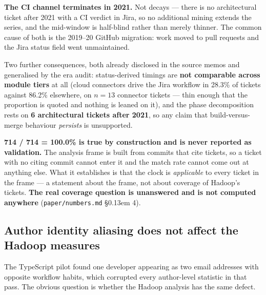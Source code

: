 \documentclass[conference]{IEEEtran}
\begin{document}
\textbf{The CI channel terminates in 2021.} Not decays --- there is no architectural ticket after 2021 with a CI verdict in Jira, so no additional mining extends the series, and the mid-window is half-blind rather than merely thinner. The common cause of both is the 2019--20 GitHub migration: work moved to pull requests and the Jira status field went unmaintained.

Two further consequences, both already disclosed in the source memos and generalised by the era audit: status-derived timings are \textbf{not comparable across module tiers} at all (cloud connectors drive the Jira workflow in 28.3\% of tickets against 86.2\% elsewhere, on $n=13$ connector tickets --- thin enough that the proportion is quoted and nothing is leaned on it), and the phase decomposition rests on \textbf{6 architectural tickets after 2021}, so any claim that build-versus- merge behaviour \emph{persists} is unsupported.

\textbf{714 / 714 = 100.0\% is true by construction and is never reported as validation.} The analysis frame is built from commits that cite tickets, so a ticket with no citing commit cannot enter it and the match rate cannot come out at anything else. What it establishes is that the clock is \emph{applicable} to every ticket in the frame --- a statement about the frame, not about coverage of Hadoop's tickets. \textbf{The real coverage question is unanswered and is not computed anywhere} (\texttt{paper/\allowbreak{}numbers.\allowbreak{}md} \S\kern0.13em 4).

\subsection{Author identity aliasing does not affect the Hadoop measures}
\label{sec:6.3}

The TypeScript pilot found one developer appearing as two email addresses with opposite workflow habits, which corrupted every author-level statistic in that pass. The obvious question is whether the Hadoop analysis has the same defect.
\end{document}
